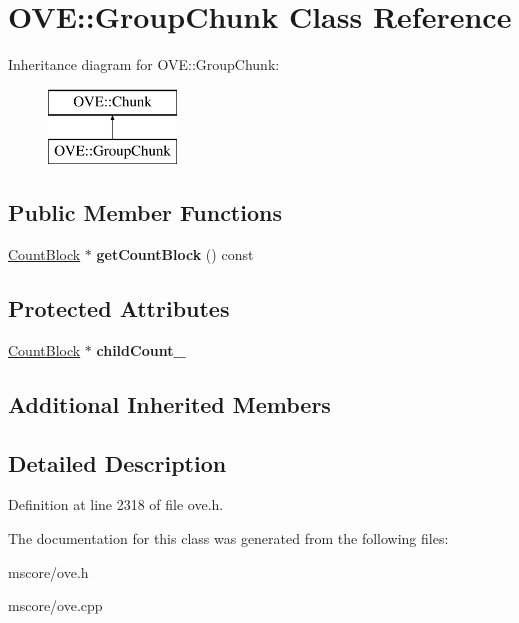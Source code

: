 \hypertarget{class_o_v_e_1_1_group_chunk}{}\section{O\+VE\+:\+:Group\+Chunk Class Reference}
\label{class_o_v_e_1_1_group_chunk}
Inheritance diagram for O\+VE\+:\+:Group\+Chunk\+:\begin{figure}[H]
\begin{center}
\leavevmode
\includegraphics[height=2.000000cm]{class_o_v_e_1_1_group_chunk}
\end{center}
\end{figure}
\subsection*{Public Member Functions}
\begin{DoxyCompactItemize}
\item 
\mbox{\label{class_o_v_e_1_1_group_chunk_a32b1647c2bdef98b4c3cb107c380b299}} 
\hyperlink{class_o_v_e_1_1_count_block}{Count\+Block} $\ast$ {\bfseries get\+Count\+Block} () const
\end{DoxyCompactItemize}
\subsection*{Protected Attributes}
\begin{DoxyCompactItemize}
\item 
\mbox{\label{class_o_v_e_1_1_group_chunk_a40005018689dc166cb1fe9d7cfc4c92b}} 
\hyperlink{class_o_v_e_1_1_count_block}{Count\+Block} $\ast$ {\bfseries child\+Count\+\_\+}
\end{DoxyCompactItemize}
\subsection*{Additional Inherited Members}


\subsection{Detailed Description}


Definition at line 2318 of file ove.\+h.



The documentation for this class was generated from the following files\+:\begin{DoxyCompactItemize}
\item 
mscore/ove.\+h\item 
mscore/ove.\+cpp\end{DoxyCompactItemize}
